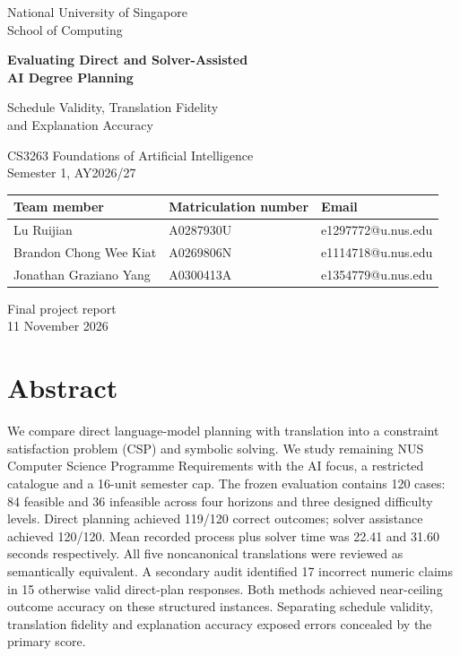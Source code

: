 \documentclass[11pt,a4paper]{article}
\renewenvironment{abstract}
  {\section*{Abstract}\begingroup\normalsize}
  {\endgroup}
\begin{document}
\hypersetup{pageanchor=false}
\begin{titlepage}
\centering
\vspace*{1.2cm}
{\Large National University of Singapore\\School of Computing\par}
\vspace{1.5cm}
{\LARGE\bfseries Evaluating Direct and Solver-Assisted\\[0.25em]
AI Degree Planning\par}
\vspace{0.7cm}
{\Large Schedule Validity, Translation Fidelity\\
and Explanation Accuracy\par}
\vspace{1.2cm}
{\large CS3263 Foundations of Artificial Intelligence\\
Semester 1, AY2026/27\par}
\vspace{1.3cm}
\begin{tabular}{lll}
\toprule
Team member & Matriculation number & Email\\
\midrule
Lu Ruijian & A0287930U & e1297772@u.nus.edu\\
Brandon Chong Wee Kiat & A0269806N & e1114718@u.nus.edu\\
Jonathan Graziano Yang & A0300413A & e1354779@u.nus.edu\\
\bottomrule
\end{tabular}
\vfill
{\large Final project report\\11 November 2026\par}
\end{titlepage}
\hypersetup{pageanchor=true}

\begin{abstract}
We compare direct language-model planning with translation into a constraint
satisfaction problem (CSP) and symbolic solving. We study remaining NUS
Computer Science Programme Requirements with the AI focus, a restricted
catalogue and a 16-unit semester cap. The frozen evaluation contains 120
cases: 84 feasible and 36 infeasible across four horizons and three designed
difficulty levels. Direct planning achieved 119/120 correct
outcomes; solver assistance achieved 120/120. Mean recorded process plus
solver time was 22.41 and 31.60 seconds respectively. All five noncanonical
translations were reviewed as semantically equivalent. A secondary audit
identified 17 incorrect numeric claims in 15 otherwise valid direct-plan
responses. Both methods achieved near-ceiling outcome accuracy on these
structured instances. Separating schedule validity, translation fidelity
and explanation accuracy exposed errors concealed by the primary score.
\end{abstract}
\end{document}
